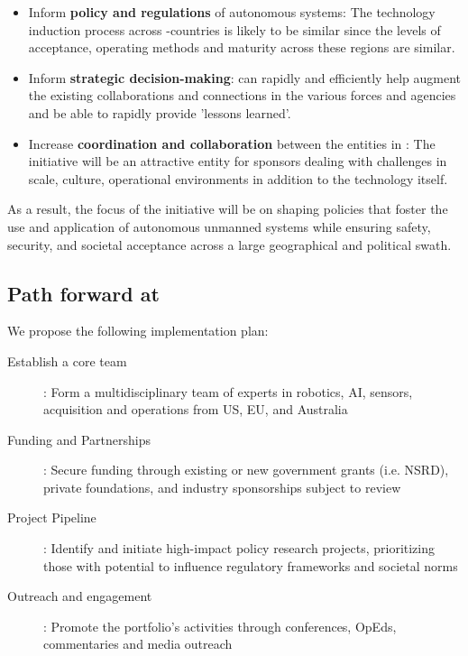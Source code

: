 \documentclass[11pt,letterpaper]{article}
\begin{document}
\begin{itemize}

\item Inform \textbf{policy and regulations} of autonomous systems: The technology induction process across \auke-countries is likely to be similar since the levels of acceptance, operating methods and maturity across these regions are similar. 

\item Inform \textbf{strategic decision-making}: \org can rapidly and efficiently help augment the existing collaborations and connections in the various forces and agencies and be able to rapidly provide ’lessons learned’.

\item Increase \textbf{coordination and collaboration} between the entities in \auke: The initiative will be an attractive entity for sponsors dealing with challenges in scale, culture, operational environments in addition to the technology itself.

\end{itemize}

As a result, the focus of the initiative will be on shaping policies that foster the use and application of autonomous unmanned systems while ensuring safety, security, and societal acceptance across a large geographical and political swath.


\subsection{Path forward at \org}

We propose the following implementation plan:

\begin{description}

\item[Establish a core team]: Form a multidisciplinary team of \org
  experts in robotics, AI, sensors, acquisition and operations from \org US, EU, and Australia

\item[Funding and Partnerships]: Secure funding through existing or
  new government grants (i.e. NSRD), private foundations, and industry
  sponsorships subject to review

\item[Project Pipeline]: Identify and initiate high-impact policy
  research projects, prioritizing those with potential to influence
  regulatory frameworks and societal norms
  
\item[Outreach and engagement]: Promote the portfolio’s activities
  through conferences, OpEds, commentaries and media outreach


\end{description}
\end{document}
